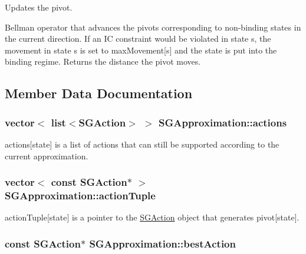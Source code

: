 Updates the pivot. 

Bellman operator that advances the pivots corresponding to non-\/binding states in the current direction. If an I\-C constraint would be violated in state s, the movement in state s is set to max\-Movement\mbox{[}s\mbox{]} and the state is put into the binding regime. Returns the distance the pivot moves. 

\subsection{Member Data Documentation}
\hypertarget{classSGApproximation_abd29fc968e004b53a2d59702657a2b70}{
\subsubsection[{actions}]{\setlength{\rightskip}{0pt plus 5cm}vector$<$ list$<${\bf S\-G\-Action}$>$ $>$ S\-G\-Approximation\-::actions\hspace{0.3cm}{\ttfamily [private]}}}\label{classSGApproximation_abd29fc968e004b53a2d59702657a2b70}
actions\mbox{[}state\mbox{]} is a list of actions that can still be supported according to the current approximation. \hypertarget{classSGApproximation_a70b2b3ee6577efd50e7cbe49b464f232}{
\subsubsection[{action\-Tuple}]{\setlength{\rightskip}{0pt plus 5cm}vector$<$ const {\bf S\-G\-Action}$\ast$ $>$ S\-G\-Approximation\-::action\-Tuple\hspace{0.3cm}{\ttfamily [private]}}}\label{classSGApproximation_a70b2b3ee6577efd50e7cbe49b464f232}
action\-Tuple\mbox{[}state\mbox{]} is a pointer to the \hyperlink{classSGAction}{S\-G\-Action} object that generates pivot\mbox{[}state\mbox{]}. \hypertarget{classSGApproximation_ab2a6d6ed6880fb4cbc05e671b6b6673a}{
\subsubsection[{best\-Action}]{\setlength{\rightskip}{0pt plus 5cm}const {\bf S\-G\-Action}$\ast$ S\-G\-Approximation\-::best\-Action\hspace{0.3cm}{\ttfamily [private]}}}\label{classSGApproximation_ab2a6d6ed6880fb4cbc05e671b6b6673a}
